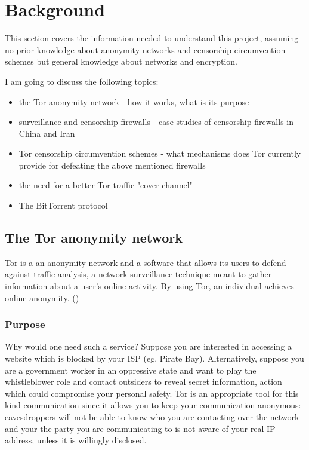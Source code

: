 \documentclass[11pt]{article} %
\begin{document}
\newpage
\section{Background}


This section covers the information needed to understand this project, assuming no prior knowledge about anonymity networks and censorship circumvention schemes but general knowledge about networks and encryption.

I am going to discuss the following topics:

\begin{itemize}
\item the Tor anonymity network - how it works, what is its purpose
\item surveillance and censorship firewalls - case studies of censorship firewalls in China and Iran 
\item Tor censorship circumvention schemes - what mechanisms does Tor currently provide for defeating the above mentioned firewalls
\item the need for a better Tor traffic "cover channel"
\item The BitTorrent protocol
\end{itemize}

\subsection{The Tor anonymity network}
Tor is a an anonymity network and a software that allows its users to defend against traffic analysis, a network surveillance technique meant to gather information about a user’s online activity. By using Tor, an individual achieves online anonymity. (\citep*{web:torOverview})

\subsubsection{Purpose}
Why would one need such a service? Suppose you are interested in accessing a website which is blocked by your ISP (eg. Pirate Bay). Alternatively, suppose you are a government worker in an oppressive state and want to play the whistleblower role and contact outsiders to reveal secret information, action which could compromise your personal safety. Tor is an appropriate tool for this kind communication since it allows you to keep your communication anonymous: eavesdroppers will not be able to know who you are contacting over the network and your the party you are communicating to is not aware of your real IP address, unless it is willingly disclosed.
\end{document}
